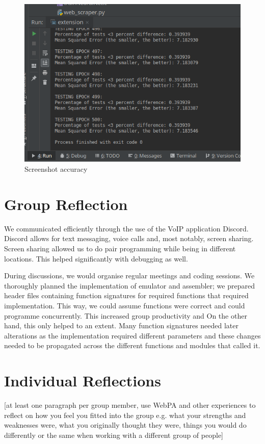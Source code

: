\documentclass[11pt]{article}
\begin{document}
\begin{figure}
\includegraphics[scale=0.8]{accuracy}
\caption{Screenshot accuracy}
\end{figure}

\section{Group Reflection}
We communicated efficiently through the use of the VoIP application Discord. 
Discord allows for text messaging, voice calls and, most notably, screen sharing.
Screen sharing allowed us to do pair programming while being in different locations. This helped significantly with debugging as well. 

During discussions, we would organise regular meetings and coding sessions. We thoroughly planned the implementation of emulator and assembler; we prepared header files containing function signatures
for required functions that 
 required implementation. This way, we could assume functions were correct and could programme concurrently.
This increased group productivity and 
On the other hand, this only helped to an extent. Many function signatures needed later alterations 
as the implementation required different parameters and these changes needed to be propagated 
across the different functions and modules that called it.

\section{Individual Reflections}
[at least one paragraph per group member, use WebPA and other experiences to reflect on how you feel you fitted into the group e.g. what your strengths and weaknesses were, what you originally thought they were, things you would do differently or the same when working with a different group of people]
\end{document}
